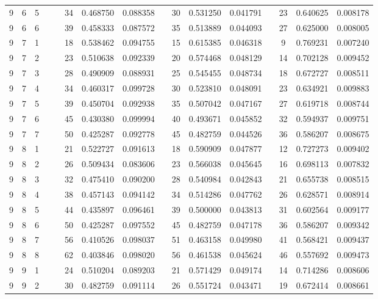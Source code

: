 \begin{appendix}
\begin{longtable}[h]{rrrccccccccccccc}
9	&	6	&	5	&&&	34	&	0.468750	&	0.088358	&&	30	&	0.531250	&	0.041791	&&	23	&	0.640625	&	0.008178	\\
9	&	6	&	6	&&&	39	&	0.458333	&	0.087572	&&	35	&	0.513889	&	0.044093	&&	27	&	0.625000	&	0.008005	\\
9	&	7	&	1	&&&	18	&	0.538462	&	0.094755	&&	15	&	0.615385	&	0.046318	&&	9	&	0.769231	&	0.007240	\\
9	&	7	&	2	&&&	23	&	0.510638	&	0.092339	&&	20	&	0.574468	&	0.048129	&&	14	&	0.702128	&	0.009452	\\
9	&	7	&	3	&&&	28	&	0.490909	&	0.088931	&&	25	&	0.545455	&	0.048734	&&	18	&	0.672727	&	0.008511	\\
9	&	7	&	4	&&&	34	&	0.460317	&	0.099728	&&	30	&	0.523810	&	0.048091	&&	23	&	0.634921	&	0.009883	\\
9	&	7	&	5	&&&	39	&	0.450704	&	0.092938	&&	35	&	0.507042	&	0.047167	&&	27	&	0.619718	&	0.008744	\\
9	&	7	&	6	&&&	45	&	0.430380	&	0.099994	&&	40	&	0.493671	&	0.045852	&&	32	&	0.594937	&	0.009751	\\
9	&	7	&	7	&&&	50	&	0.425287	&	0.092778	&&	45	&	0.482759	&	0.044526	&&	36	&	0.586207	&	0.008675	\\
9	&	8	&	1	&&&	21	&	0.522727	&	0.091613	&&	18	&	0.590909	&	0.047877	&&	12	&	0.727273	&	0.009402	\\
9	&	8	&	2	&&&	26	&	0.509434	&	0.083606	&&	23	&	0.566038	&	0.045645	&&	16	&	0.698113	&	0.007832	\\
9	&	8	&	3	&&&	32	&	0.475410	&	0.090200	&&	28	&	0.540984	&	0.042843	&&	21	&	0.655738	&	0.008515	\\
9	&	8	&	4	&&&	38	&	0.457143	&	0.094142	&&	34	&	0.514286	&	0.047762	&&	26	&	0.628571	&	0.008914	\\
9	&	8	&	5	&&&	44	&	0.435897	&	0.096461	&&	39	&	0.500000	&	0.043813	&&	31	&	0.602564	&	0.009177	\\
9	&	8	&	6	&&&	50	&	0.425287	&	0.097552	&&	45	&	0.482759	&	0.047178	&&	36	&	0.586207	&	0.009342	\\
9	&	8	&	7	&&&	56	&	0.410526	&	0.098037	&&	51	&	0.463158	&	0.049980	&&	41	&	0.568421	&	0.009437	\\
9	&	8	&	8	&&&	62	&	0.403846	&	0.098020	&&	56	&	0.461538	&	0.045624	&&	46	&	0.557692	&	0.009473	\\
9	&	9	&	1	&&&	24	&	0.510204	&	0.089203	&&	21	&	0.571429	&	0.049174	&&	14	&	0.714286	&	0.008606	\\
9	&	9	&	2	&&&	30	&	0.482759	&	0.091114	&&	26	&	0.551724	&	0.043471	&&	19	&	0.672414	&	0.008661	\\

\end{longtable}
\end{appendix}
